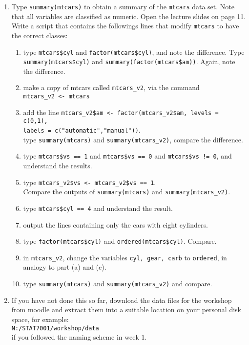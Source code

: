 \begin{enumerate}

\item Type \texttt{summary(mtcars)} to obtain a summary of the \texttt{mtcars} data set. Note that all variables are classified as numeric. Open the lecture slides on page 11. Write a script that contains the followings lines that modify \texttt{mtcars} to have the correct classes:
\begin{enumerate}
\item type \texttt{mtcars\$cyl} and \texttt{factor(mtcars\$cyl)}, and note the difference. Type \texttt{summary(mtcars\$cyl)} and \texttt{summary(factor(mtcars\$am))}. Again, note the difference.
\item make a copy of mtcars called \texttt{mtcars\_v2}, via the command \\\texttt{mtcars\_v2 <- mtcars}
\item add the line \texttt{mtcars\_v2\$am <- factor(mtcars\_v2\$am, levels = c(0,1),\\
        labels = c("automatic","manual"))}.\\
      type \texttt{summary(mtcars)} and \texttt{summary(mtcars\_v2)}, compare the difference.
\item type \texttt{mtcars\$vs == 1} and \texttt{mtcars\$vs == 0} and \texttt{mtcars\$vs != 0}, and understand the results.
\item type \texttt{mtcars\_v2\$vs <- mtcars\_v2\$vs == 1}.\\ Compare the outputs of \texttt{summary(mtcars)} and \texttt{summary(mtcars\_v2)}.
\item type \texttt{mtcars\$cyl == 4} and understand the result.
\item output the lines containing only the cars with eight cylinders.
\item type \texttt{factor(mtcars\$cyl)} and \texttt{ordered(mtcars\$cyl)}. Compare.
\item in \texttt{mtcars\_v2}, change the variables  \texttt{cyl, gear, carb} to \texttt{ordered}, in analogy to part (a) and (c).
\item type \texttt{summary(mtcars)} and \texttt{summary(mtcars\_v2)} and compare.
\end{enumerate}


\item If you have not done this so far, download the data files for the workshop from moodle and extract them into a suitable location on your personal disk space, for example:\\
\texttt{N:/STAT7001/workshop/data}\\
if you followed the naming scheme in week 1.


\end{enumerate}
